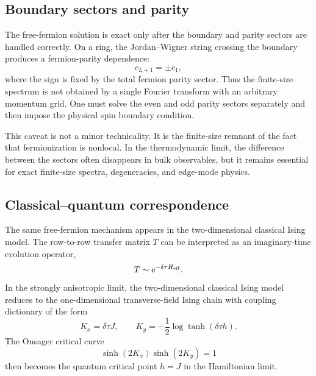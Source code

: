 \subsection{Boundary sectors and parity}

The free-fermion solution is exact only after the boundary and parity sectors are handled correctly.  On a ring, the Jordan--Wigner string crossing the boundary produces a fermion-parity dependence:
\begin{equation}
\label{eq:conclusion-parity-boundary}
    c_{L+1}=\pm c_1,
\end{equation}
where the sign is fixed by the total fermion parity sector.  Thus the finite-size spectrum is not obtained by a single Fourier transform with an arbitrary momentum grid.  One must solve the even and odd parity sectors separately and then impose the physical spin boundary condition.

This caveat is not a minor technicality.  It is the finite-size remnant of the fact that fermionization is nonlocal.  In the thermodynamic limit, the difference between the sectors often disappears in bulk observables, but it remains essential for exact finite-size spectra, degeneracies, and edge-mode physics.

\subsection{Classical--quantum correspondence}

The same free-fermion mechanism appears in the two-dimensional classical Ising model.  The row-to-row transfer matrix \(T\) can be interpreted as an imaginary-time evolution operator,
\begin{equation}
\label{eq:conclusion-transfer-hamiltonian}
    T\sim \mathrm{e}^{-\delta\tau H_{\rm eff}} .
\end{equation}
In the strongly anisotropic limit, the two-dimensional classical Ising model reduces to the one-dimensional transverse-field Ising chain with coupling dictionary of the form
\begin{equation}
\label{eq:conclusion-ising-tfim-dictionary}
    K_x=\delta\tau J,
    \qquad
    K_y=-\frac12\log\tanh(\delta\tau h).
\end{equation}
The Onsager critical curve
\begin{equation}
\label{eq:conclusion-onsager-critical}
    \sinh(2K_x)\sinh(2K_y)=1
\end{equation}
then becomes the quantum critical point \(h=J\) in the Hamiltonian limit.

